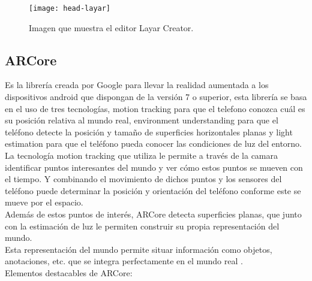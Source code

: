 \begin{itemize}
\begin{itemize}
\begin{figure}[h]
  \centering
  \texttt{[image: head-layar]}
  \caption{Imagen que muestra el editor Layar Creator.\protect\footnotemark}
  \label{figura-layar}
\end{figure}


\subsection{ARCore}
Es la librería creada por Google para llevar la realidad aumentada a los dispositivos android que dispongan de la versión 7 o superior, esta librería se basa en el uso de tres tecnologías, motion tracking para que el telefono conozca cuál es su posición relativa al mundo real, environment understanding para que el teléfono detecte la posición y tamaño de superficies horizontales planas y light estimation para que el teléfono pueda conocer las condiciones de luz del entorno.\\

La tecnología motion tracking que utiliza le permite a través de la camara identificar puntos interesantes del mundo y ver cómo estos puntos se mueven con el tiempo. Y combinando el movimiento de dichos puntos y los sensores del teléfono puede determinar la posición y orientación del teléfono conforme este se mueve por el espacio.\\

Además de estos puntos de interés, ARCore detecta superficies planas, que junto con la estimación de luz le permiten construir su propia representación del mundo.\\

Esta representación del mundo permite situar información como objetos, anotaciones, etc. que se integra perfectamente en el mundo real \cite{arcore}.\\

Elementos destacables de ARCore:


\end{itemize}
\end{itemize}
